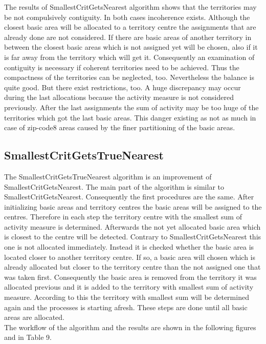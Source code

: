 The results of SmallestCritGetsNearest algorithm shows that the territories may be not compulsively contiguity. In both cases incoherence exists. Although the closest basic area will be allocated to a territory centre the assignments that are already done are not considered. If there are basic areas of another territory in between the closest basic areas which is not assigned yet will be chosen, also if it is far away from the territory which will get it. Consequently an examination of contiguity is necessary if coherent territories need to be achieved. Thus the compactness of the territories can be neglected, too. Nevertheless the balance is quite good. But there exist restrictions, too. A huge discrepancy may occur during the last allocations because the activity measure is not considered previously. After the last assignments the sum of activity may be too huge of the territories which got the last basic areas. This danger existing as not as much in case of zip-code8 areas caused by the finer partitioning of the basic areas.

\subsection{SmallestCritGetsTrueNearest}

The SmallestCritGetsTrueNearest algorithm is an improvement of SmallestCritGetsNearest. The main part of the algorithm is similar to SmallestCritGetsNearest. Consequently the first procedures are the same. After initializing basic areas and territory centres the basic areas will be assigned to the centres. Therefore in each step the territory centre with the smallest sum of activity measure is determined. Afterwards the not yet allocated basic area which is closest to the centre will be detected. Contrary to SmallestCritGetsNearest this one is not allocated immediately. Instead it is checked whether the basic area is located closer to another territory centre. If so, a basic area will chosen which is already allocated but closer to the territory centre than the not assigned one that was taken first. Consequently the basic area is removed from the territory it was allocated previous and it is added to the territory with smallest sum of activity measure. According to this the territory with smallest sum will be determined again and the processes is starting afresh. These steps are done until all basic areas are allocated.\\
The workflow of the algorithm and the results are shown in the following figures and in Table 9.


